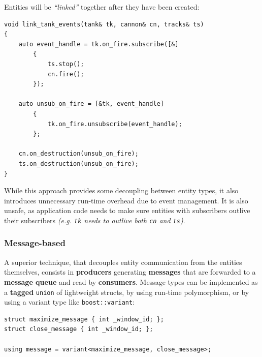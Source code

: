 \documentclass[oneside, 12pt, a4paper, openany]{book}
\begin{document}
Entities will be \emph{``linked''} together after they have been
created:

\begin{verbatim}
void link_tank_events(tank& tk, cannon& cn, tracks& ts)
{
    auto event_handle = tk.on_fire.subscribe([&]
        {
            ts.stop();
            cn.fire();
        });

    auto unsub_on_fire = [&tk, event_handle]
        {
            tk.on_fire.unsubscribe(event_handle);
        };

    cn.on_destruction(unsub_on_fire);
    ts.on_destruction(unsub_on_fire);
}
\end{verbatim}

While this approach provides some decoupling between entity types, it
also introduces unnecessary run-time overhead due to event management.
It is also unsafe, as application code needs to make sure entities with
subscribers outlive their subscribers \emph{(e.g.
\texttt{tk}
needs to outlive both
\texttt{cn}
and
\texttt{ts})}.

\subsubsection{Message-based}\label{message-based}

A superior technique, that decouples entity communication from the
entities themselves, consists in \textbf{producers} generating
\textbf{messages} that are forwarded to a \textbf{message queue} and
read by \textbf{consumers}. Message types can be implemented as a
\textbf{tagged}
\texttt{union}
of lightweight structs, by using run-time polymorphism, or by using a
variant type like
\texttt{boost::variant}:

\begin{verbatim}
struct maximize_message { int _window_id; };
struct close_message { int _window_id; };

using message = variant<maximize_message, close_message>;
\end{verbatim}
\end{document}
